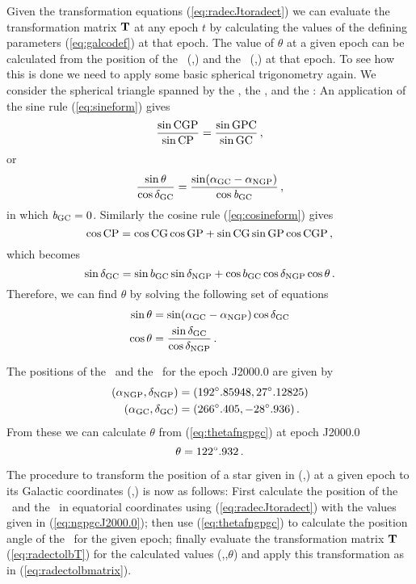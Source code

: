 Given the transformation equations (\ref{eq:radecJtoradect}) we can
evaluate the transformation matrix $\mathbf{T}$ at any epoch $t$ by
calculating the values of the defining parameters (\ref{eq:galcodef})
at that epoch. The value of $\theta$ at a given epoch can be
calculated from the position of the \ngp\ (\rangp,\decngp) and the \gc\
(\ragc,\decgc) at that epoch. To see how this is done we need to apply
some basic spherical trigonometry again. We consider the spherical
triangle spanned by the \ngp, the \gc, and the \ncp: An application of
the sine rule (\ref{eq:sineform}) gives
\begin{equation}
\frac{\sin \textnormal{C} \textnormal{G} \textnormal{P}}{\sin \textnormal{C} \textnormal{P}} = \frac{\sin \textnormal{G} \textnormal{P} \textnormal{C}}{\sin \textnormal{G} \textnormal{C}}\, ,
\end{equation}
or
\begin{equation}
\frac{\sin \theta}{\cos \delta_{\textnormal{GC}}} = \frac{\sin(\alpha_{\textnormal{GC}} -\alpha_{\textnormal{NGP}})}{\cos {\it b}_{\textnormal{GC}}}\, ,
\end{equation}
in which ${\it b}_{\textnormal{GC}} = 0$. Similarly the cosine rule (\ref{eq:cosineform}) gives
\begin{equation}
\cos \textnormal{C} \textnormal{P} = \cos \textnormal{C} \textnormal{G} \cos \textnormal{G} \textnormal{P} + \sin \textnormal{C} \textnormal{G} \sin \textnormal{G} \textnormal{P} \cos \textnormal{C} \textnormal{G} \textnormal{P}\, ,
\end{equation}
which becomes
\begin{equation}
\sin \delta_{\textnormal{GC}} = \sin b_{\textnormal{GC}} \sin \delta_{\textnormal{NGP}} + \cos b_{\textnormal{GC}} \cos \delta_{\textnormal{NGP}}  \cos \theta\, .
\end{equation}
Therefore, we can find $\theta$ by solving the following set of equations
\begin{align}\label{eq:thetafngpgc}
\sin \theta & = \sin(\alpha_{\textnormal{GC}} - \alpha_{\textnormal{NGP}})\cos \delta_{\textnormal{GC}}\\
\cos \theta &= \frac{\sin \delta_{\textnormal{GC}}}{\cos\delta_{\textnormal{NGP}}}\, .
\end{align}

The positions of the \ngp\ and the \gc\ for the epoch J2000.0 are
given by \citep[]{1998gaas.book.....B}
\begin{align}
(\alpha_{\textnormal{NGP}},\delta_{\textnormal{NGP}}) & = (192^{\circ}.85948,27^{\circ}.12825)\nonumber\\
(\alpha_{\textnormal{GC}}, \delta_{\textnormal{GC}}) &= (266^{\circ}.405,-28^{\circ}.936)\, \label{eq:ngpgcJ2000.0}.
\end{align}
From these we can calculate $\theta$ from (\ref{eq:thetafngpgc}) at
epoch J2000.0
\begin{equation}\label{eq:thetaJ2000.0}
\theta = 122^{\circ}.932\, .
\end{equation}

The procedure to transform the position of a star given in (\ra,\dec)
at a given epoch to its Galactic coordinates (\gall,\galb) is now as
follows: First calculate the position of the \ngp\ and the \gc\ in
equatorial coordinates using (\ref{eq:radecJtoradect}) with the values
given in (\ref{eq:ngpgcJ2000.0}); then use (\ref{eq:thetafngpgc}) to
calculate the position angle of the \gc\ for the given epoch; finally
evaluate the transformation matrix $\mathbf{T}$ (\ref{eq:radectolbT}) for the
calculated values (\rangp,\decngp,$\theta$) and apply this
transformation as in (\ref{eq:radectolbmatrix}).


